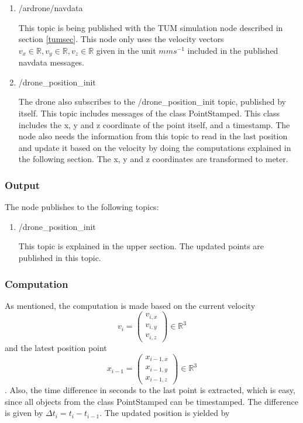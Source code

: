 	\begin{enumerate}
	\item{/ardrone/navdata}
	
	This topic is being published with the TUM simulation node described in section \ref{tumsec}.
	This node only uses the velocity vectors
	$v_x \in \mathbb{R}, v_y \in \mathbb{R}, v_z \in \mathbb{R}$ given in the unit $mms^{-1}$ included in the published navdata messages. 
	
	\item{/drone\_position\_init}
	
	The drone also subscribes to the /drone\_position\_init topic, published by itself. This topic includes messages of the class PointStamped. 
	This class includes the x, y and z coordinate of the point itself, and a timestamp.  
	The node also needs the information from this topic 
	to read in the last position and update it based on the velocity by doing the computations explained in the following section. The x, y and z 
	coordinates are transformed to meter. 
	\end{enumerate}
	
	\subsubsection{Output}
	
	The node publishes to the following topics:
	
	\begin{enumerate}
	\item{/drone\_position\_init}
	
	This topic is explained in the upper section. The updated points are published in this topic.
	
	\end{enumerate}
	
	\subsubsection{Computation}
	
	As mentioned, the computation is made based on the current velocity $$v_i = \begin{pmatrix} v_{i,x} \\ v_{i,y} \\ v_{i,z} \end{pmatrix} \in \mathbb{R}^3$$ and the 
	latest position point $$x_{i-1} = \begin{pmatrix} x_{i-1,x} \\ x_{i-1,y} \\ x_{i-1, z} \end{pmatrix} \in \mathbb{R}^3$$. Also, the time difference 
	in seconds to the last point is extracted, which is easy, since all objects from the class PointStamped can be timestamped. The difference is given by 
	$\Delta t_i =  t_i - t_{i-1}$. The updated position is yielded by
	
